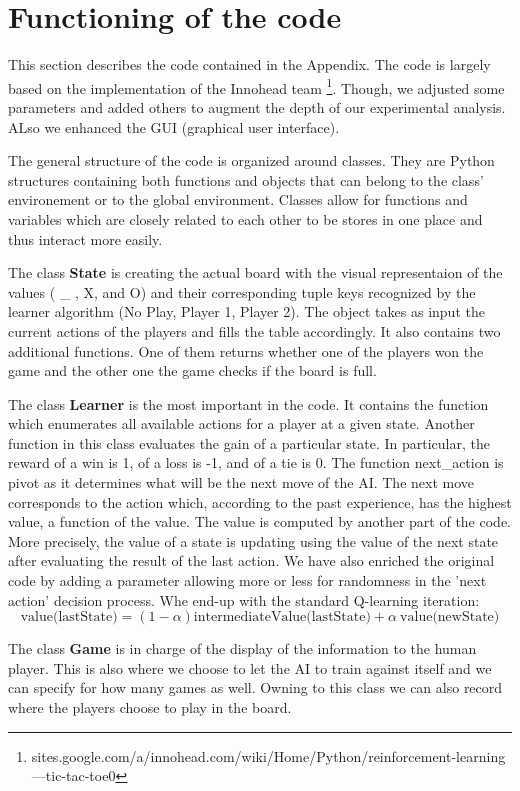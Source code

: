 \documentclass[fleqn]{article}
\begin{document}
\section{Functioning of the code}
This section describes the code contained in the Appendix. The code is largely based on the implementation of the Innohead team \footnote{sites.google.com/a/innohead.com/wiki/Home/Python/reinforcement-learning---tic-tac-toe0}. Though, we adjusted some parameters and added others to augment the depth of our experimental analysis. ALso we enhanced the GUI (graphical user interface).

The general structure of the code is organized around classes. They are Python structures containing both functions and objects that can belong to the class' environement or to the global environment. Classes allow for functions and variables which are closely related to each other to be stores in one place and thus interact more easily. 

The class  \textbf{State} is creating the actual board with the visual representaion of the values ( \_ , X, and O) and their corresponding tuple keys recognized by the learner algorithm (No Play, Player 1, Player 2). The object takes as input the current actions of the players and fills the table accordingly. It also contains two additional functions. One of them returns whether one of the players won the game and the other one the game checks if the board is full. 

The class  \textbf{Learner} is the most important in the code. It contains the function which enumerates all available actions for a player at a given state. Another function in this class evaluates the gain of a particular state. In particular, the reward of a win is 1, of a loss is -1, and of a tie is 0. The function next\_action is pivot as it determines what will be the next move of the AI. The next move corresponds to the action which, according to the past experience, has the highest value, a function of the value. The value is computed by another part of the code. More precisely, the value of a state is updating using the value of the next state after evaluating the result of the last action. We have also enriched the original code by adding a parameter allowing more or less for randomness in the 'next action' decision process. Whe end-up with the standard Q-learning iteration:
$$\text{value(lastState)} = (1-\alpha)\text{intermediateValue(lastState)} + \alpha \ \text{value(newState)}$$

The class  \textbf{Game} is in charge of the display of the information to the human player. This is also where we choose to let the AI to train against itself and we can specify for how many games as well. Owning to this class we can also record where the players choose to play in the board.
\end{document}
